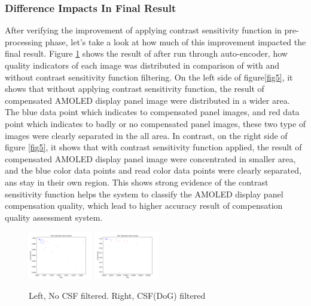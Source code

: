 \documentclass{article}
\begin{document}
\subsubsection{Difference Impacts In Final Result}
After verifying the improvement of applying contrast sensitivity function in pre-processing phase, let's take a look at how much of this improvement impacted the final result. Figure \ref{fig4} shows the result of after run through auto-encoder, how quality indicators of each image was distributed in comparison of with and without contrast sensitivity function filtering.  On the left side of figure\ref{fig5}, it shows that without applying contrast sensitivity function, the result of compensated AMOLED display panel image were distributed in a wider area. The blue data point which indicates to compensated panel images, and red data point which indicates to badly or no compensated panel images, these two type of images were clearly separated in the all area. In contrast, on the right side of figure \ref{fig5}, it shows that with contrast sensitivity function applied, the result of compensated AMOLED display panel image were concentrated in smaller area, and the blue color data points and read color data points were clearly separated, ans stay in their own region. This shows strong evidence of the contrast sensitivity function helps the system to classify the AMOLED display panel compensation quality, which lead to higher accuracy result of compensation quality assessment system.
\begin{figure}[h]
    \centering
    \includegraphics[width=0.25\textwidth]{images/1440P_NoCSFed_0r_123b_result.png}\Vhfill
    \includegraphics[width=0.25\textwidth]{images/1440P_CSFed_0r_123b_result.png}\Vhfill
    \caption{Left, No CSF filtered. Right, CSF(DoG) filtered  }
    \label{fig4}
\end{figure}
\end{document}
